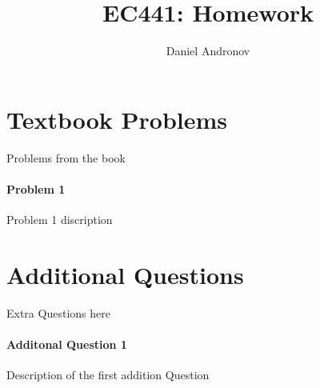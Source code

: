 \documentclass[12pt]{article}
\title{EC441: Homework \hwNum{}}
\author{Daniel Andronov}
\date{\displaydate{date}}
\begin{document}
\maketitle
\newpage

\section{Textbook Problems}
Problems from the book

\paragraph{Problem 1}
Problem 1 discription

\section{Additional Questions}
Extra Questions here

\paragraph{Additonal Question 1}
Description of the first addition Question
\end{document}
